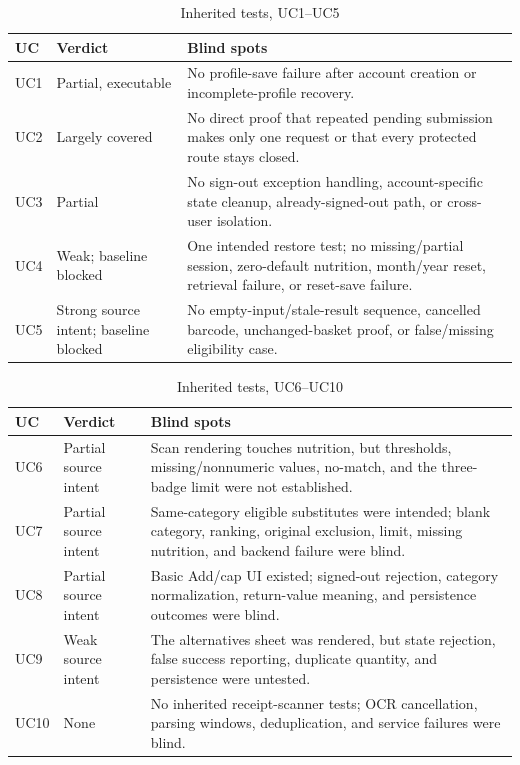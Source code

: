 \documentclass[sigconf]{acmart}
\begin{document}
\begin{table}[H]
  \caption{Inherited tests, UC1--UC5}
  \label{tab:inherited-1}
  \centering
  \scriptsize
  \begin{tabular}{@{}L{0.09\columnwidth}L{0.28\columnwidth}L{0.53\columnwidth}@{}}
    \toprule
    UC & Verdict & Blind spots \\
    \midrule
    UC1 & Partial, executable & No profile-save failure after account creation or incomplete-profile recovery. \\
    UC2 & Largely covered & No direct proof that repeated pending submission makes only one request or that every protected route stays closed. \\
    UC3 & Partial & No sign-out exception handling, account-specific state cleanup, already-signed-out path, or cross-user isolation. \\
    UC4 & Weak; baseline blocked & One intended restore test; no missing/partial session, zero-default nutrition, month/year reset, retrieval failure, or reset-save failure. \\
    UC5 & Strong source intent; baseline blocked & No empty-input/stale-result sequence, cancelled barcode, unchanged-basket proof, or false/missing eligibility case. \\
    \bottomrule
  \end{tabular}
\end{table}

\begin{table}[H]
  \caption{Inherited tests, UC6--UC10}
  \label{tab:inherited-2}
  \centering
  \scriptsize
  \begin{tabular}{@{}L{0.09\columnwidth}L{0.28\columnwidth}L{0.53\columnwidth}@{}}
    \toprule
    UC & Verdict & Blind spots \\
    \midrule
    UC6 & Partial source intent & Scan rendering touches nutrition, but thresholds, missing/nonnumeric values, no-match, and the three-badge limit were not established. \\
    UC7 & Partial source intent & Same-category eligible substitutes were intended; blank category, ranking, original exclusion, limit, missing nutrition, and backend failure were blind. \\
    UC8 & Partial source intent & Basic Add/cap UI existed; signed-out rejection, category normalization, return-value meaning, and persistence outcomes were blind. \\
    UC9 & Weak source intent & The alternatives sheet was rendered, but state rejection, false success reporting, duplicate quantity, and persistence were untested. \\
    UC10 & None & No inherited receipt-scanner tests; OCR cancellation, parsing windows, deduplication, and service failures were blind. \\
    \bottomrule
  \end{tabular}
\end{table}
\end{document}
